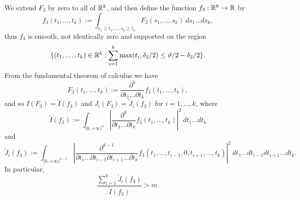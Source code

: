 We extend $F_3$ by zero to all of $\mathbb{R}^k$, and then define the function $f_3: \mathbb{R}^k \to \mathbb{R}$ by
$$ f_3(t_1,\dots,t_k) := \int_{s_1 \geq t_1, \dots, s_k \geq t_k} F_3(s_1,\dots,s_k)\ ds_1 \dots ds_k,$$
thus $f_3$ is smooth, not identically zero and supported on the region
\begin{equation}\label{ftj-set}
 \{ (t_1,\dots,t_k) \in \mathbb{R}^k: \sum_{i=1}^k \max(t_i, \delta_2/2) \leq \vartheta/2 - \delta_2/2 \}.
\end{equation}
From the fundamental theorem of calculus we have
\begin{equation}\label{ftj}
 F_3(t_1,\dots,t_k) := \frac{\partial^k}{\partial t_1 \dots \partial t_k} f_3(t_1,\dots,t_k),
\end{equation}
and so $I(F_3) = \tilde I(f_3)$ and $J_i(F_3) = \tilde J_i(f_3)$ for $i=1,\dots,k$, where
\begin{equation}\label{tidef}
 \tilde I(f_3) := \int_{[0,+\infty)^k} \left|\frac{\partial^k}{\partial t_1 \dots \partial t_k} f_3(t_1,\dots,t_k)\right|^2\ dt_1 \dots dt_k
\end{equation}
and
\begin{equation}\label{tjdef}
 \tilde J_i(f_3) := \int_{[0,+\infty)^{k-1}} \left|\frac{\partial^{k-1}}{\partial t_1 \dots \partial t_{i-1} \partial t_{i+1} \dots \partial t_k} f_3(t_1,\dots,t_{i-1}, 0, t_{i+1}, \dots, t_k)\right|^2\ dt_1 \dots dt_{i-1} dt_{i+1} \dots dt_k.
\end{equation}
In particular, 
\begin{equation}\label{jbig-5}
 \frac{\sum_{i=1}^k \tilde J_i(f_3)}{\tilde I(f_3)} > m.
\end{equation}

